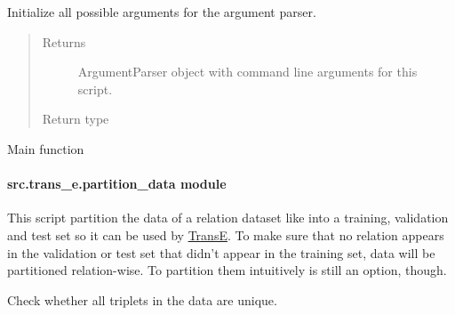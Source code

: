 \documentclass[letterpaper,10pt,english]{sphinxmanual}
\begin{document}

\begin{fulllineitems}
\label{src.trans_e:src.trans_e.differentiate_datasets.init_argparse}
Initialize all possible arguments for the argument parser.
\begin{quote}\begin{description}
\item[{Returns}] \leavevmode
ArgumentParser object with command line arguments for this script.

\item[{Return type}] \leavevmode
{}

\end{description}\end{quote}

\end{fulllineitems}


\begin{fulllineitems}
\label{src.trans_e:src.trans_e.differentiate_datasets.main}
Main function

\end{fulllineitems}



\paragraph{src.trans\_e.partition\_data module}
\label{src.trans_e:src-trans-e-partition-data-module}\label{src.trans_e:module-src.trans_e.partition_data}
This script partition the data of a relation dataset like  into a training, validation and test set so it
can be used by \href{https://github.com/glorotxa/SME}{TransE}.
To make sure that no relation appears in the validation or test set that didn't appear in the training set, data
will be partitioned relation-wise. To partition them intuitively is still an option, though.

\begin{fulllineitems}
\label{src.trans_e:src.trans_e.partition_data.check_data_integrity}
Check whether all triplets in the data are unique.

\end{fulllineitems}
\end{document}
